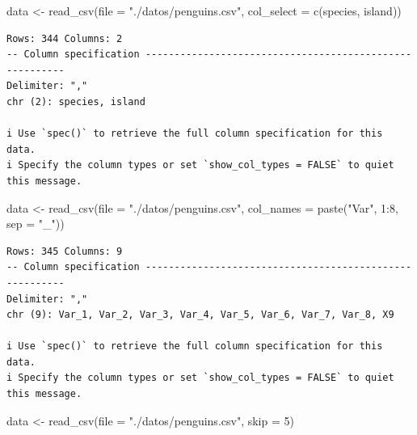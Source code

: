 \documentclass[
  letterpaper,
  DIV=11,
  numbers=noendperiod]{scrreprt}
\newenvironment{Shaded}{\begin{snugshade}}{\end{snugshade}}
\newcommand{\AttributeTok}[1]{\textcolor[rgb]{0.40,0.45,0.13}{#1}}
\newcommand{\DecValTok}[1]{\textcolor[rgb]{0.68,0.00,0.00}{#1}}
\newcommand{\FunctionTok}[1]{\textcolor[rgb]{0.28,0.35,0.67}{#1}}
\newcommand{\NormalTok}[1]{\textcolor[rgb]{0.00,0.23,0.31}{#1}}
\newcommand{\OtherTok}[1]{\textcolor[rgb]{0.00,0.23,0.31}{#1}}
\newcommand{\SpecialCharTok}[1]{\textcolor[rgb]{0.37,0.37,0.37}{#1}}
\newcommand{\StringTok}[1]{\textcolor[rgb]{0.13,0.47,0.30}{#1}}
\begin{document}
\begin{Shaded}
\begin{Highlighting}[]
\NormalTok{data }\OtherTok{\textless{}{-}} \FunctionTok{read\_csv}\NormalTok{(}\AttributeTok{file =} \StringTok{"./datos/penguins.csv"}\NormalTok{, }\AttributeTok{col\_select =} \FunctionTok{c}\NormalTok{(species, island))}
\end{Highlighting}
\end{Shaded}

\begin{verbatim}
Rows: 344 Columns: 2
-- Column specification --------------------------------------------------------
Delimiter: ","
chr (2): species, island

i Use `spec()` to retrieve the full column specification for this data.
i Specify the column types or set `show_col_types = FALSE` to quiet this message.
\end{verbatim}

\begin{Shaded}
\begin{Highlighting}[]
\NormalTok{data }\OtherTok{\textless{}{-}} \FunctionTok{read\_csv}\NormalTok{(}\AttributeTok{file =} \StringTok{"./datos/penguins.csv"}\NormalTok{,}
                 \AttributeTok{col\_names =} \FunctionTok{paste}\NormalTok{(}\StringTok{"Var"}\NormalTok{, }\DecValTok{1}\SpecialCharTok{:}\DecValTok{8}\NormalTok{, }\AttributeTok{sep =} \StringTok{"\_"}\NormalTok{))}
\end{Highlighting}
\end{Shaded}

\begin{verbatim}
Rows: 345 Columns: 9
-- Column specification --------------------------------------------------------
Delimiter: ","
chr (9): Var_1, Var_2, Var_3, Var_4, Var_5, Var_6, Var_7, Var_8, X9

i Use `spec()` to retrieve the full column specification for this data.
i Specify the column types or set `show_col_types = FALSE` to quiet this message.
\end{verbatim}

\begin{Shaded}
\begin{Highlighting}[]
\NormalTok{data }\OtherTok{\textless{}{-}} \FunctionTok{read\_csv}\NormalTok{(}\AttributeTok{file =} \StringTok{"./datos/penguins.csv"}\NormalTok{, }\AttributeTok{skip =} \DecValTok{5}\NormalTok{)}
\end{Highlighting}
\end{Shaded}
\end{document}
